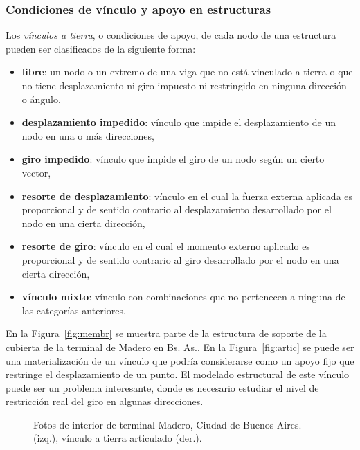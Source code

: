 \subsubsection{Condiciones de vínculo y apoyo en estructuras}

Los \textit{vínculos a tierra}, o condiciones de apoyo, de cada nodo de una estructura pueden ser clasificados de la siguiente forma:
%
\begin{itemize}
\item \textbf{libre}: un nodo o un extremo de una viga que no está vinculado a tierra o que no tiene desplazamiento ni giro impuesto ni restringido en ninguna dirección o ángulo,
%
\item \textbf{desplazamiento impedido}: vínculo que impide el desplazamiento de un nodo en una o más direcciones,
%
\item \textbf{giro impedido}: vínculo que impide el giro de un nodo según un cierto vector,
%
\item \textbf{resorte de desplazamiento}: vínculo en el cual la fuerza externa aplicada es proporcional y de sentido contrario al desplazamiento desarrollado por el nodo en una cierta dirección,
%
\item \textbf{resorte de giro}: vínculo en el cual el momento externo aplicado es proporcional y de sentido contrario al giro desarrollado por el nodo en una cierta dirección,
%
\item \textbf{vínculo mixto}: vínculo con combinaciones que no pertenecen a ninguna de las categorías anteriores.
%
\end{itemize}

En la Figura~\ref{fig:membr} se muestra parte de la estructura de soporte de la cubierta de la terminal de Madero en Bs. As.. %
%
En la Figura~\ref{fig:artic} se puede ser una materialización de un vínculo que podría considerarse como un apoyo fijo que restringe el desplazamiento de un punto. %
%
El modelado estructural de este vínculo puede ser un problema interesante, donde es necesario estudiar el nivel de restricción real del giro en algunas direcciones. %
%
\begin{figure}[htb]
	\centering
	\caption{Fotos de interior de terminal Madero, Ciudad de Buenos Aires.  (izq.), vínculo a tierra articulado (der.).}
	\label{fig:bsas}
\end{figure}

